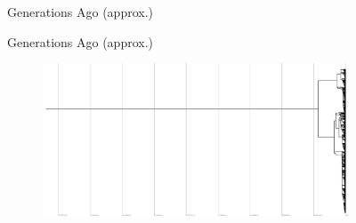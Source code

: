 \begin{figure}
  \begin{minipage}{1\columnwidth}
    \centering
    Generations Ago (approx.)
  \end{minipage}
  \hfill
  \begin{minipage}{1\columnwidth}
    \centering
    Generations Ago (approx.)
  \end{minipage}
  \begin{minipage}{1\columnwidth}
    \hspace{0.02\linewidth}
    \hfill
    \hfill
    \hfill
    \hfill
  \end{minipage}
  \hfill
  \begin{minipage}{1\columnwidth}
    \hspace{0.02\linewidth}
    \hfill
    \hfill
    \hfill
    \hfill
  \end{minipage}
  \hfill
  \begin{subfigure}[b]{1\columnwidth}
    \includegraphics[height=0.12\textheight,width=\textwidth]{img/perfect-tree-phylogenies-log/epoch=7+resolution=3+treatment=2/a=collapsed-phylogeny+epoch=00007+mut_distn=np.random.standard_normal+num_generations=32768+num_islands=1+num_niches=1+p_island_migration=0.01+p_niche_invasion=3.0517578125e-08+population_size=32768+r.../eplicate=0+tournament_size=4+treatment=2+_generation=262144+_index=2+scale=log+ext=.pdf}

\end{subfigure}
\end{figure}
